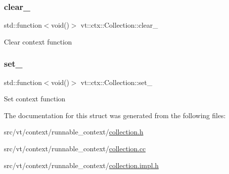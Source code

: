 \subsubsection{\texorpdfstring{clear\+\_\+}{clear\_}}
{\footnotesize\ttfamily std\+::function$<$void()$>$ vt\+::ctx\+::\+Collection\+::clear\+\_\+\hspace{0.3cm}{\ttfamily [private]}}

Clear context function \mbox{\label{structvt_1_1ctx_1_1_collection_a0a8366979772c939b109323587154940}} 
\subsubsection{\texorpdfstring{set\+\_\+}{set\_}}
{\footnotesize\ttfamily std\+::function$<$void()$>$ vt\+::ctx\+::\+Collection\+::set\+\_\+\hspace{0.3cm}{\ttfamily [private]}}

Set context function 

The documentation for this struct was generated from the following files\+:\begin{DoxyCompactItemize}
\item 
src/vt/context/runnable\+\_\+context/\hyperlink{collection_8h}{collection.\+h}\item 
src/vt/context/runnable\+\_\+context/\hyperlink{collection_8cc}{collection.\+cc}\item 
src/vt/context/runnable\+\_\+context/\hyperlink{collection_8impl_8h}{collection.\+impl.\+h}\end{DoxyCompactItemize}
